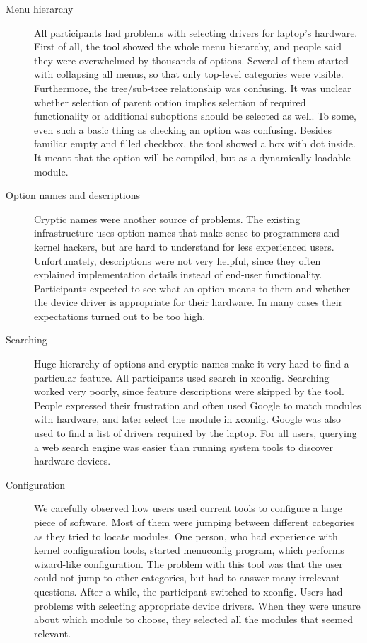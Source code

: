 \documentclass{chi2009}
\begin{document}
\begin{description}
  \item[Menu hierarchy]
All participants had problems with selecting drivers for laptop's hardware. First of all, the tool showed the whole menu hierarchy, and people said they were overwhelmed by thousands of options. Several of them started with collapsing all menus, so that only top-level categories were visible. Furthermore, the tree/sub-tree relationship was confusing. It was unclear whether selection of parent option implies selection of required functionality or additional suboptions should be selected as well. To some, even such a basic thing as checking an option was confusing. Besides familiar empty and filled checkbox, the tool showed a box with dot inside. It meant that the option will be compiled, but as a dynamically loadable module.

  \item[Option names and descriptions]
Cryptic names were another source of problems. The existing infrastructure uses option names that make sense to programmers and kernel hackers, but are hard to understand for less experienced users. Unfortunately, descriptions were not very helpful, since they often explained implementation details instead of end-user functionality. Participants expected to see what an option means to them and whether the device driver is appropriate for their hardware. In many cases their expectations turned out to be too high.

  \item[Searching]
Huge hierarchy of options and cryptic names make it very hard to find a particular feature. All participants used search in \textsf{xconfig}. Searching worked very poorly, since feature descriptions were skipped by the tool. People expressed their frustration and often used Google to match modules with hardware, and later select the module in \textsf{xconfig}. Google was also used to find a list of drivers required by the laptop. For all users, querying a web search engine was easier than running system tools to discover hardware devices.

  \item[Configuration]
We carefully observed how users used current tools to configure a large piece of software. Most of them were jumping between different categories as they tried to locate modules. One person, who had experience with kernel configuration tools, started \textsf{menuconfig} program, which performs wizard-like configuration. The problem with this tool was that the user could not jump to other categories, but had to answer many irrelevant questions. After a while, the participant switched to \textsf{xconfig}. Users had problems with selecting appropriate device drivers. When they were unsure about which module to choose, they selected all the modules that seemed relevant. 
\end{description}
\end{document}
